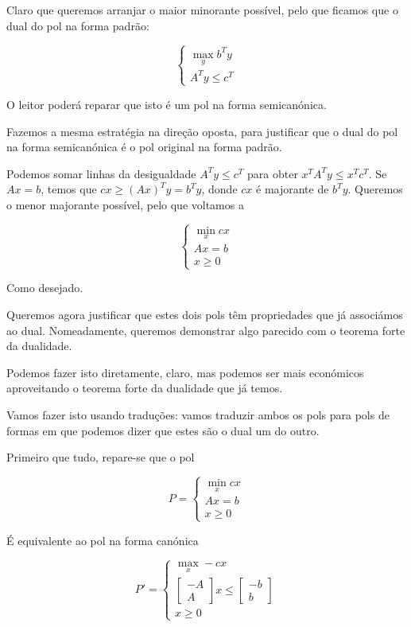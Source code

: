 \documentclass{article}
\theoremstyle{definition}
\begin{document}
	Claro que queremos arranjar o maior minorante possível, pelo que ficamos que o dual do pol na forma padrão:
	
	\[
	\begin{cases}
	\max\limits_y b^T y\\
	A^T y \leq c^T
	\end{cases}
	\]
	
	O leitor poderá reparar que isto é um pol na forma semicanónica.
	
	Fazemos a mesma estratégia na direção oposta, para justificar que o dual do pol na forma semicanónica é o pol original na forma padrão.
	
	Podemos somar linhas da desigualdade $A^T y \leq c^T$ para obter $x^T A^T y \leq x^T c^T$. Se $Ax = b$, temos que $cx \geq (Ax)^T y = b^T y$, donde $cx$ é majorante de $b^T y$. Queremos o menor majorante possível, pelo que voltamos a
	
	\[
	\begin{cases}
	\min\limits_x cx\\
	Ax = b\\
	x \geq 0
	\end{cases}
	\]
	
	Como desejado.
	
	Queremos agora justificar que estes dois pols têm propriedades que já associámos ao dual. Nomeadamente, queremos demonstrar algo parecido com o teorema forte da dualidade.
	
	Podemos fazer isto diretamente, claro, mas podemos ser mais económicos aproveitando o teorema forte da dualidade que já temos.
	
	Vamos fazer isto usando traduções: vamos traduzir ambos os pols para pols de formas em que podemos dizer que estes são o dual um do outro.
	
	Primeiro que tudo, repare-se que o pol
	
	\[
	P =
	\begin{cases}
	\min\limits_x cx\\
	Ax = b\\
	x \geq 0
	\end{cases}
	\]
	
	É equivalente ao pol na forma canónica
	
	
	\[
	P' =
	\begin{cases}
	\max\limits_x -cx\\
	\begin{bmatrix}
	-A \\
	A
	\end{bmatrix}
	x \leq
	\begin{bmatrix}
	-b \\
	b
	\end{bmatrix}\\
	x \geq 0
	\end{cases}
	\]
	
\end{document}
